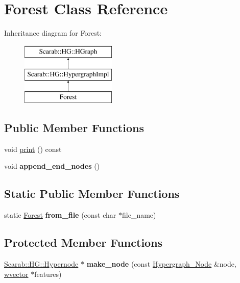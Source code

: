 \hypertarget{classForest}{
\section{Forest Class Reference}
\label{classForest}
}
Inheritance diagram for Forest:\begin{figure}[H]
\begin{center}
\leavevmode
\includegraphics[height=3cm]{classForest}
\end{center}
\end{figure}
\subsection*{Public Member Functions}
\begin{DoxyCompactItemize}
\item 
void \hyperlink{classForest_a621a1a65d0f877bb33b15c79f9e24c4d}{print} () const 
\item 
\hypertarget{classForest_a4cc0cf94c18913eadd0b36f3dcf68cef}{
void {\bfseries append\_\-end\_\-nodes} ()}
\label{classForest_a4cc0cf94c18913eadd0b36f3dcf68cef}

\end{DoxyCompactItemize}
\subsection*{Static Public Member Functions}
\begin{DoxyCompactItemize}
\item 
\hypertarget{classForest_a1b9ddc0e03c1ccfcc73987fe9378fa84}{
static \hyperlink{classForest}{Forest} {\bfseries from\_\-file} (const char $\ast$file\_\-name)}
\label{classForest_a1b9ddc0e03c1ccfcc73987fe9378fa84}

\end{DoxyCompactItemize}
\subsection*{Protected Member Functions}
\begin{DoxyCompactItemize}
\item 
\hypertarget{classForest_ab40070ea9e3885d252fb7848c11f27ef}{
\hyperlink{classScarab_1_1HG_1_1Hypernode}{Scarab::HG::Hypernode} $\ast$ {\bfseries make\_\-node} (const \hyperlink{classHypergraph__Node}{Hypergraph\_\-Node} \&node, \hyperlink{classsvector}{wvector} $\ast$features)}
\label{classForest_ab40070ea9e3885d252fb7848c11f27ef}

\end{DoxyCompactItemize}


